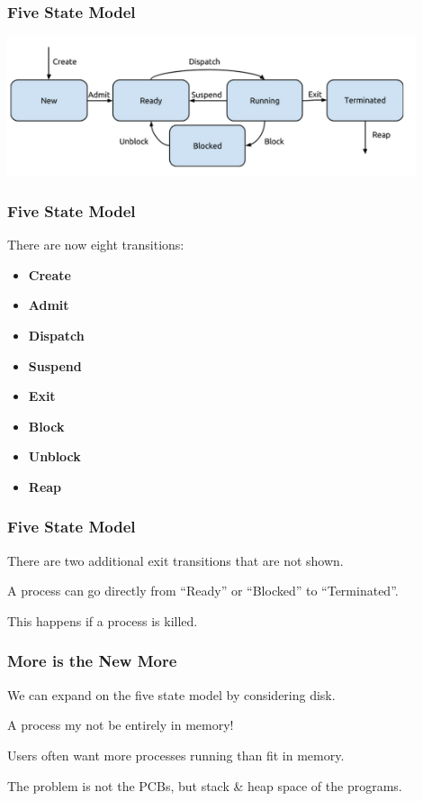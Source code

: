 \begin{frame}
	\frametitle{Five State Model}

	\begin{center}
		\includegraphics[width=0.9\textwidth]{images/5-state-model.png}
	\end{center}

\end{frame}

\begin{frame}
	\frametitle{Five State Model}

	There are now eight transitions:

	\begin{itemize}
		\item \textbf{Create}
		\item \textbf{Admit}
		\item \textbf{Dispatch}
		\item \textbf{Suspend}
		\item \textbf{Exit}
		\item \textbf{Block}
		\item \textbf{Unblock}
		\item \textbf{Reap}
	\end{itemize}

\end{frame}

\begin{frame}
	\frametitle{Five State Model}

	There are two additional exit transitions that are not shown.

	A process can go directly from ``Ready'' or ``Blocked'' to ``Terminated''.

	This happens if a process is killed.

\end{frame}

\begin{frame}
	\frametitle{More is the New More}

	We can expand on the five state model by considering disk.

	A process my not be entirely in memory!

	Users often want more processes running than fit in memory.

	The problem is not the PCBs, but stack \& heap space of the programs.

\end{frame}

